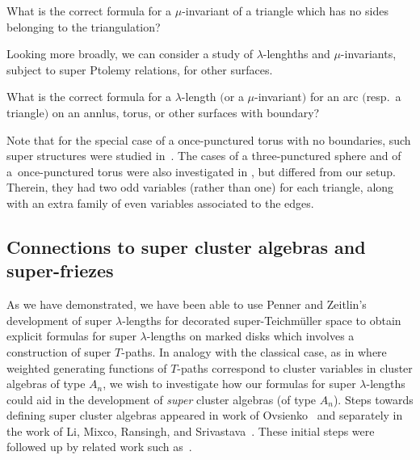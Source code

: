 \documentclass[pdftex]{sigma}
\numberwithin{equation}{section}
\begin{document}
\begin{Question}
 What is the correct formula for a $\mu$-invariant of a triangle which has no sides belonging to the triangulation?
\end{Question}

Looking more broadly, we can consider a study of $\lambda$-lenghths and $\mu$-invariants, subject to super Ptolemy relations, for other surfaces.
\begin{Question}
 What is the correct formula for a $\lambda$-length $($or a $\mu$-invariant$)$ for an arc $($resp.\ a triangle$)$ on an annlus, torus, or other surfaces with boundary?
\end{Question}

Note that for the special case of a once-punctured torus with no boundaries, such super structures were studied in~\cite{mcshane}.
The cases of a three-punctured sphere and of a~once-punctured torus were also investigated in \cite[Appendix~B]{ip2018n}, but differed from our setup.
Therein, they had two odd variables (rather than one) for each triangle{, along with an extra family of even variables associated to the edges}.

\subsection{Connections to super cluster algebras and super-friezes}\label{sec:subfrieze}

As we have demonstrated, we have been able to use Penner and Zeitlin's development of super $\lambda$-lengths for decorated super-Teichm\"uller space to obtain explicit formulas for super $\lambda$-lengths on marked disks which involves a construction of super $T$-paths.
In analogy with the classical case, as in \cite{schiffler_08} where weighted generating functions of $T$-paths correspond to cluster variables in cluster algebras of type $A_n$, we wish to investigate how our formulas for super $\lambda$-lengths could aid in the development of \emph{super} cluster algebras (of type $A_n$). Steps towards defining super cluster algebras appeared in work of Ovsienko~\cite{o_15} and separately in the work of Li, Mixco, Ransingh, and Srivastava~\cite{lmrs_17}. These initial steps were followed up by related work such as~\cite{OS19,OT18,sv_19}.
\end{document}
